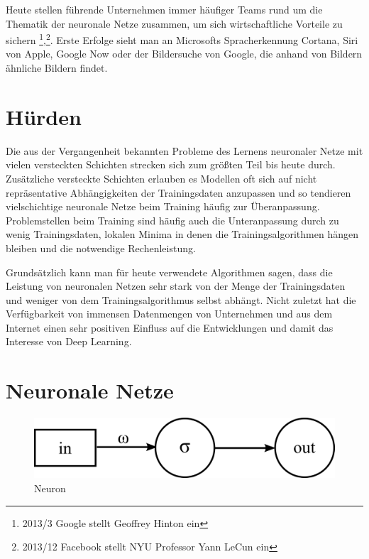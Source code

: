 Heute stellen führende Unternehmen immer häufiger Teams rund um die Thematik der neuronale Netze zusammen, um sich wirtschaftliche Vorteile zu sichern \footnote{2013/3 Google stellt Geoffrey Hinton ein},\footnote{2013/12 Facebook stellt NYU Professor Yann LeCun ein}. Erste Erfolge sieht man an Microsofts Spracherkennung Cortana, Siri von Apple, Google Now oder der Bildersuche von Google, die anhand von Bildern ähnliche Bildern findet.


\section{Hürden}

Die aus der Vergangenheit bekannten Probleme des Lernens neuronaler Netze mit vielen versteckten Schichten strecken sich zum größten Teil bis heute durch. Zusätzliche versteckte Schichten erlauben es Modellen oft sich auf nicht repräsentative Abhängigkeiten der Trainingsdaten anzupassen und so tendieren vielschichtige neuronale Netze beim Training häufig zur Überanpassung. Problemstellen beim Training sind häufig auch die Unteranpassung durch zu wenig Trainingsdaten, lokalen Minima in denen die Trainingsalgorithmen hängen bleiben und die notwendige Rechenleistung.

Grundsätzlich kann man für heute verwendete Algorithmen sagen, dass die Leistung von neuronalen Netzen sehr stark von der Menge der Trainingsdaten und weniger von dem Trainingsalgorithmus selbst abhängt. Nicht zuletzt hat die Verfügbarkeit von immensen Datenmengen von Unternehmen und aus dem Internet einen sehr positiven Einfluss auf die Entwicklungen und damit das Interesse von Deep Learning.


\section{Neuronale Netze}

\begin{figure}
	\centering
	\includegraphics[scale=1]{images/neuron.png}
	\caption{Neuron}
	\label{fig:neuron}
\end{figure}

